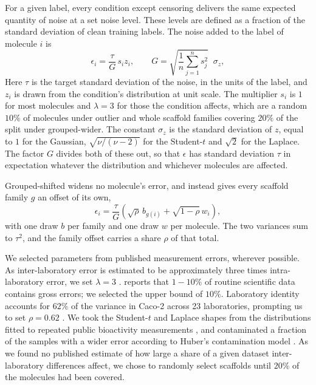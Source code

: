 For a given label, every condition except censoring delivers the same expected quantity of noise at a set noise level. These levels are defined as a fraction of the standard deviation of clean training labels. The noise added to the label of molecule $i$ is
\begin{equation}
\epsilon_i = \frac{\tau}{G}\,s_i z_i,
\qquad
G = \sqrt{\frac{1}{n}\sum_{j=1}^{n} s_j^{2}}\;\;\sigma_z,
\label{eq:dose_matching}
\end{equation}
Here $\tau$ is the target standard deviation of the noise, in the units of the label, and $z_i$ is
drawn from the condition's distribution at unit scale. The multiplier $s_i$ is $1$ for most
molecules and $\lambda = 3$ for those the condition affects, which are a random $10\%$ of molecules
under outlier and whole scaffold families covering $20\%$ of the split under grouped-wider. The
constant $\sigma_z$ is the standard deviation of $z$, equal to $1$ for the Gaussian,
$\sqrt{\nu/(\nu-2)}$ for the Student-$t$ and $\sqrt{2}$ for the Laplace. The factor $G$ divides both
of these out, so that $\epsilon$ has standard deviation $\tau$ in expectation whatever the
distribution and whichever molecules are affected.

Grouped-shifted widens no molecule's error, and instead gives every scaffold family $g$ an offset of
its own,
\begin{equation}
\epsilon_i = \frac{\tau}{G}\left(\sqrt{\rho}\,b_{g(i)} + \sqrt{1-\rho}\,w_i\right),
\label{eq:grouped_shifted}
\end{equation}
with one draw $b$ per family and one draw $w$ per molecule. The two variances sum to $\tau^{2}$, and
the family offset carries a share $\rho$ of that total.

We selected parameters from published measurement errors, wherever possible. As inter-laboratory error is estimated to be approximately three times intra-laboratory error, we set $\lambda = 3$ \citep{Avdeef2019}. \cite{Hampel2001} reports that $1-10\%$ of routine scientific data contains gross errors; we selected the upper bound of $10\%$. Laboratory identity accounts for $62\%$ of the variance in Caco-2 across 23 laboratories, prompting us to set $\rho = 0.62$ \citep{Bentz2013}. We took the Student-$t$ and Laplace shapes from the distributions fitted to repeated public bioactivity measurements \citep{Kruger2012}, and contaminated a fraction of the samples with a wider error according to Huber's contamination model \citep{huber1964robust}. As we found no published estimate of how large a share of a given dataset inter-laboratory differences affect, we chose to randomly select scaffolds until $20\%$ of the molecules had been covered. 

